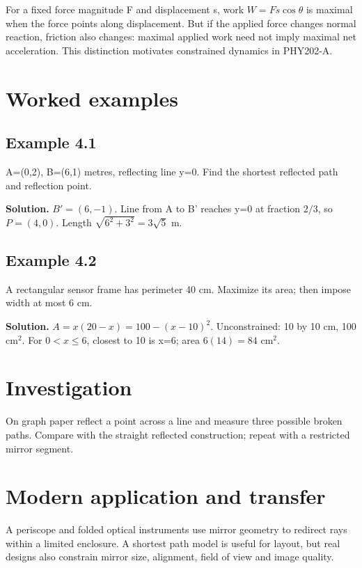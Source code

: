 \documentclass[11pt,a4paper,openany]{book}
\begin{document}
For a fixed force magnitude F and displacement s, work $W=Fs\cos\theta$ is maximal when the force points along displacement. But if the applied force changes normal reaction, friction also changes: maximal applied work need not imply maximal net acceleration. This distinction motivates constrained dynamics in PHY202-A.
\begin{center}
\end{center}
\section{Worked examples}
\subsection*{Example 4.1}
A=(0,2), B=(6,1) metres, reflecting line y=0. Find the shortest reflected path and reflection point.

\textbf{Solution.} $B'=(6,-1)$. Line from A to B' reaches y=0 at fraction $2/3$, so $P=(4,0)$. Length $\sqrt{6^2+3^2}=3\sqrt5$ m.
\subsection*{Example 4.2}
A rectangular sensor frame has perimeter 40 cm. Maximize its area; then impose width at most 6 cm.

\textbf{Solution.} $A=x(20-x)=100-(x-10)^2$. Unconstrained: 10 by 10 cm, 100 cm$^2$. For $0<x\le6$, closest to 10 is x=6; area $6(14)=84$ cm$^2$.
\section{Investigation}
On graph paper reflect a point across a line and measure three possible broken paths. Compare with the straight reflected construction; repeat with a restricted mirror segment.
\section{Modern application and transfer}
A periscope and folded optical instruments use mirror geometry to redirect rays within a limited enclosure. A shortest path model is useful for layout, but real designs also constrain mirror size, alignment, field of view and image quality.
\end{document}
